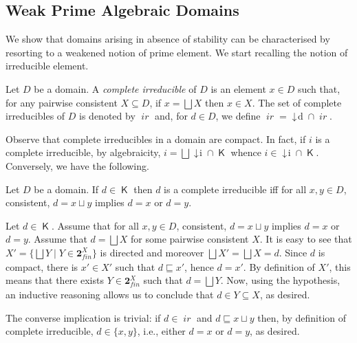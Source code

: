 \documentclass[conference]{IEEEtran}
\renewenvironment{proof}{\begin{IEEEproof}}{\end{IEEEproof}}
\newcommand{\compact}[1]{\ensuremath{\mathop{\mathsf{K}({#1})}}}
\newcommand{\principal}[1]{\ensuremath{\mathop{\downarrow\!{#1}}}}
\newcommand{\ir}[1]{\ensuremath{\mathop{\mathit{ir}({#1})}}}
\newcommand{\Powfin}[1]{\ensuremath{\mathbf{2}_\mathit{fin}^{#1}}}
\begin{document}
\subsection{Weak Prime Algebraic Domains}
\label{ss:weakdomains}

We show that domains arising in absence of stability can be
characterised by resorting to a weakened notion of prime element. 
We start recalling the notion of irreducible element.

\begin{definition}[irreducibles]
  Let $D$ be a domain. A \emph{complete irreducible} of $D$ is an
  element $x \in D$ such that, for any pairwise consistent
  $X \subseteq D$, if $x = \bigsqcup X$ then $x \in X$.  The set of
  complete irreducibles of $D$ is denoted by $\ir{D}$ and, for
  $d \in D$, we define $\ir{d} = \principal{d} \cap \ir{D}$.
\end{definition}

Observe that complete irreducibles in a domain are compact. In fact,
if $i$ is a complete irreducible, by algebraicity,
$i = \bigsqcup \principal{i} \cap \compact{D}$ whence
$i \in \principal{i} \cap \compact{D}$. Conversely, we have the following.

\begin{lemma}
  \label{le:comp-irr}
  Let $D$ be a domain. If $d \in \compact{D}$ then $d$ is a complete
  irreducible iff for all $x, y \in D$, consistent,
  $d = x \sqcup y$ implies $d = x$ or $d=y$.
\end{lemma}

\begin{proof}
  Let $d \in \compact{D}$. Assume that for all $x, y \in D$, consistent,
  $d = x \sqcup y$ implies $d = x$ or $d=y$.
  Assume that $d = \bigsqcup X$ for some pairwise consistent $X$. It
  is easy to see that $X' = \{ \bigsqcup Y \mid Y \in \Powfin{X} \}$
  is directed and {moreover} $\bigsqcup X' = \bigsqcup X = d$. Since $d$
  is compact, there is $x' \in X'$ such that $d \sqsubseteq x'$, hence
  $d = x'$. By definition of $X'$, this means that there exists
  $Y \in \Powfin{X}$ such that $d = \bigsqcup Y$. {Now, using the hypothesis,
  an inductive reasoning} allows us to conclude that
  $d \in Y \subseteq X$, as desired.

  The converse implication is trivial: if $d \in \ir{D}$ and
  $d \sqsubseteq x \sqcup y$ then, by definition of complete
  irreducible, $d \in \{x,y\}$, i.e., either $d=x$ or $d=y$, as
  desired.
\end{proof}
\end{document}
